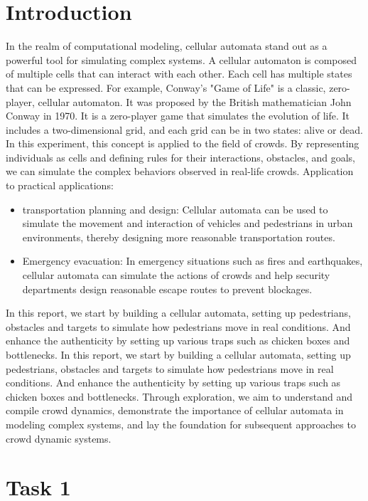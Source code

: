 \documentclass[10pt,a4paper]{article}
\begin{document}
\frontpage

\section{Introduction}

In the realm of computational modeling, cellular automata stand out as a powerful tool for simulating complex systems. A cellular automaton is composed of multiple cells that can interact with each other. Each cell has multiple states that can be expressed. For example, Conway's "Game of Life"\cite{gardner1970mathematical} is a classic, zero-player, cellular automaton. It was proposed by the British mathematician John Conway in 1970. It is a zero-player game that simulates the evolution of life. It includes a two-dimensional grid, and each grid can be in two states: alive or dead. \\
In this experiment, this concept is applied to the field of crowds. By representing individuals as cells and defining rules for their interactions, obstacles, and goals, we can simulate the complex behaviors observed in real-life crowds. Application to practical applications: 
\begin{itemize}
    \item transportation planning and design: Cellular automata can be used to simulate the movement and interaction of vehicles and pedestrians in urban environments, thereby designing more reasonable transportation routes.
    \item Emergency evacuation: In emergency situations such as fires and earthquakes, cellular automata can simulate the actions of crowds and help security departments design reasonable escape routes to prevent blockages.
\end{itemize}
In this report, we start by building a cellular automata, setting up pedestrians, obstacles and targets to simulate how pedestrians move in real conditions. And enhance the authenticity by setting up various traps such as chicken boxes and bottlenecks. In this report, we start by building a cellular automata, setting up pedestrians, obstacles and targets to simulate how pedestrians move in real conditions. And enhance the authenticity by setting up various traps such as chicken boxes and bottlenecks.
Through exploration, we aim to understand and compile crowd dynamics, demonstrate the importance of cellular automata in modeling complex systems, and lay the foundation for subsequent approaches to crowd dynamic systems.

\section{Task 1}
\end{document}
